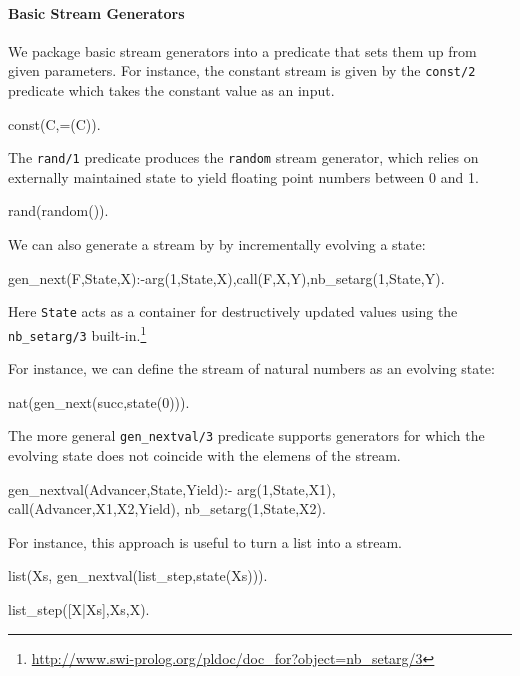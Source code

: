 \documentclass{new_tlp}
\begin{document}
\paragraph{Basic Stream Generators}
We package basic stream generators into a predicate that sets them up from
given parameters.
For instance, the constant stream is given by the {\tt const/2} predicate
which takes the constant value as an input.
\begin{code}
const(C,=(C)).
\end{code}

The {\tt rand/1} predicate produces the {\tt random} stream generator, which relies on externally maintained state
to yield floating point numbers between 0 and 1.
\begin{code}
rand(random()).
\end{code}

We can also generate a stream by by incrementally evolving a state:
\begin{code}
gen_next(F,State,X):-arg(1,State,X),call(F,X,Y),nb_setarg(1,State,Y).
\end{code}
Here {\tt State} acts as a container for destructively updated values using the
{\tt nb\_setarg/3} built-in.\footnote{\url{http://www.swi-prolog.org/pldoc/doc_for?object=nb_setarg/3}}


For instance, we can define the stream of natural numbers as an evolving state:
\begin{code}
nat(gen_next(succ,state(0))).
\end{code}

The more general {\tt gen\_nextval/3} predicate supports generators for which
the evolving state does not coincide with the elemens of the stream.
\begin{code}
gen_nextval(Advancer,State,Yield):-
  arg(1,State,X1),
  call(Advancer,X1,X2,Yield),
  nb_setarg(1,State,X2).
\end{code}

For instance, this approach is useful to turn a list into a stream.
\begin{code}
list(Xs, gen_nextval(list_step,state(Xs))).

list_step([X|Xs],Xs,X).
\end{code}

% 
\end{document}
